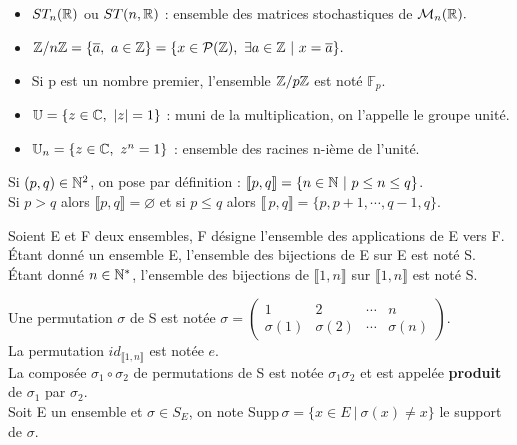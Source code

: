 \begin{itemize}[leftmargin=0cm,label=•]
    \item \(ST_n(\mathbb{R})\) ou \(ST(n,\mathbb{R})\) : ensemble des matrices stochastiques de \(\mathcal{M}_n(\mathbb{R}).\)
     
    \item \(\ZZ /n\ZZ=\{\overline{a},\ a\in \ZZ\}=\{x\in \mathcal{P}(\ZZ),\ \exists a\in \ZZ \ \rvert \ x=\overline{a} \}. \) 
    
    \item Si p est un nombre premier, l'ensemble \(\mathbb{Z} /p\mathbb{Z}\) est noté \(\mathbb{F}_p\).
    
    \item \(\mathbb{U}=\{z\in \CC,\ |z|=1\}\) : muni de la multiplication, on l'appelle le groupe unité.
    
    \item \(\mathbb{U}_n=\{z\in \CC,\ z^n=1\}\) : ensemble des racines n-ième de l'unité.
\end{itemize}

\vspace{1.3cm}

Si \((p,q)\in \mathbb{N}^2\), on pose par définition : \(\llbracket p,q \rrbracket = \{n\in \mathbb{N} \ \rvert \ p\leq n\leq q \}\).\vspace{0.1cm}\\
Si \(p>q\) alors \(\llbracket p,q \rrbracket = \varnothing\) et si \(p\leq q\) alors \(\llbracket\, p,q \rrbracket = \{p,p+1,\cdots,q-1,q\}\).

\vspace{1.3cm}

\noindent Soient E et F deux ensembles, F désigne l'ensemble des applications de E vers F.\vspace{0.2cm}\\
Étant donné un ensemble E, l'ensemble des bijections de E sur E est noté S.\\
Étant donné \(n\in \mathbb{N}^*\), l'ensemble des bijections de \(\llbracket 1,n\rrbracket\) sur \(\llbracket 1,n\rrbracket\) est noté S.

\vspace{1.2cm}

\noindent Une permutation \(\sigma\) de S est notée \(\sigma=\left(
\begin{array}{cccc}
    1 & 2 & \cdots & n \\
    \sigma(1) & \sigma(2) & \cdots & \sigma(n)
\end{array}
 \right).\)\vspace{-0.2cm}\\
La permutation \(id_{\llbracket 1,n\rrbracket}\) est notée \(e\).\\
La composée \(\sigma_1\circ \sigma_2\) de permutations de S est notée \(\sigma_1 \sigma_2\) et est appelée \textbf{produit} de \(\sigma_1\) par \(\sigma_2\).\\
Soit E un ensemble et \(\sigma \in S_E\), on note Supp\(\, \sigma =\{x\in E \ \rvert \ \sigma(x)\neq x \} \) le support de \(\sigma\).

